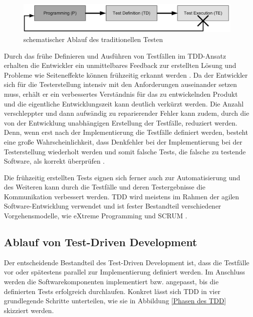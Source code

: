 \begin{figure}[h]
	\centering
	\includegraphics[clip,width=1\linewidth]{images/schematischer Ablauf traditionelles Testen.jpg}
	\caption[schematischer Ablauf des traditionellen Testen]{schematischer Ablauf des traditionellen Testen \cite[S.151]{schatten_best_2010}}
	\label{schematischer Ablauf traditionelles Testen}
\end{figure}

Durch das frühe Definieren und Ausführen von Testfällen im TDD-Ansatz erhalten die Entwickler ein unmittelbares Feedback zur erstellten Lösung und Probleme wie Seiteneffekte können frühzeitig erkannt werden \cite[S. 151]{schatten_best_2010}. 
Da der Entwickler sich für die Testerstellung intensiv mit den Anforderungen auseinander setzen muss, erhält er ein verbessertes Verständnis für das zu entwickelnden Produkt und die eigentliche Entwicklungszeit kann deutlich verkürzt werden. Die Anzahl verschleppter und dann aufwändig zu reparierender Fehler kann zudem, durch die von der Entwicklung unabhängigen Erstellung der Testfälle, reduziert werden. Denn, wenn erst nach der Implementierung die Testfälle definiert werden, besteht eine große Wahrscheinlichkeit, dass Denkfehler bei der Implementierung bei der Testerstellung wiederholt werden und somit falsche Tests, die falsche zu testende Software, als korrekt überprüfen \cite[S.188] {kleuker_qualitatssicherung_2019}.  

Die frühzeitig erstellten Tests eignen sich ferner auch zur Automatisierung und des Weiteren kann durch die Testfälle und deren Testergebnisse die Kommunikation verbessert werden. TDD wird meistens im Rahmen der agilen Software-Entwicklung verwendet und ist fester Bestandteil verschiedener Vorgehensmodelle, wie eXtreme Programming und SCRUM \cite[S. 151]{schatten_best_2010}. 

\subsection{Ablauf von Test-Driven Development}

Der entscheidende Bestandteil des Test-Driven Development ist, dass die Testfälle vor oder spätestens parallel zur Implementierung definiert werden. Im Anschluss werden die Softwarekomponenten implementiert bzw. angepasst, bis die definierten Tests erfolgreich durchlaufen. Konkret lässt sich TDD in vier grundlegende Schritte unterteilen, wie sie in Abbildung \ref{Phasen des TDD} skizziert werden. \cite[S. 153]{schatten_best_2010}

